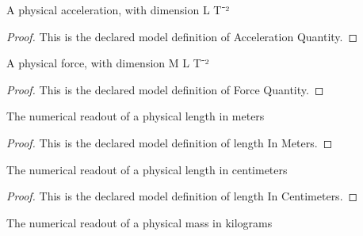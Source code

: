 \begin{definition}
  \label{def:physics:phyx-mini-0167:phyxminiproblems-problemphyxmini0167-accelerationquantity}
  A physical acceleration, with dimension L T⁻²
\end{definition}
\begin{proof}
  This is the declared model definition of Acceleration Quantity.
\end{proof}
\begin{definition}
  \label{def:physics:phyx-mini-0167:phyxminiproblems-problemphyxmini0167-forcequantity}
  A physical force, with dimension M L T⁻²
\end{definition}
\begin{proof}
  This is the declared model definition of Force Quantity.
\end{proof}
\begin{definition}
  \label{def:physics:phyx-mini-0167:phyxminiproblems-problemphyxmini0167-lengthinmeters}
  The numerical readout of a physical length in meters
\end{definition}
\begin{proof}
  This is the declared model definition of length In Meters.
\end{proof}
\begin{definition}
  \label{def:physics:phyx-mini-0167:phyxminiproblems-problemphyxmini0167-lengthincentimeters}
  The numerical readout of a physical length in centimeters
\end{definition}
\begin{proof}
  This is the declared model definition of length In Centimeters.
\end{proof}
\begin{definition}
  \label{def:physics:phyx-mini-0167:phyxminiproblems-problemphyxmini0167-massinkilograms}
  The numerical readout of a physical mass in kilograms
\end{definition}
